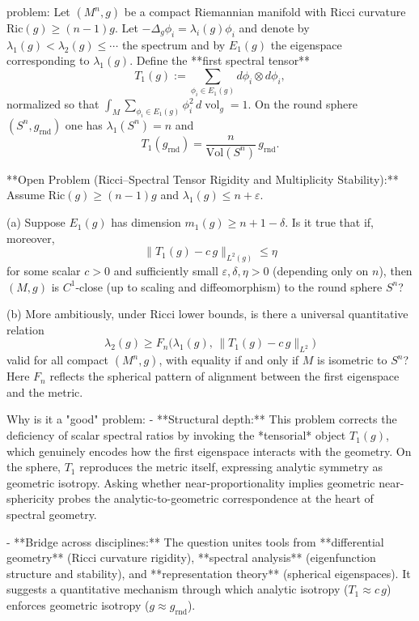 problem:  
Let \((M^n,g)\) be a compact Riemannian manifold with Ricci curvature \(\mathrm{Ric}(g)\ge (n-1)g\).  
Let \(-\Delta_g\phi_i = \lambda_i(g)\phi_i\) and denote by \(\lambda_1(g)<\lambda_2(g)\le\cdots\) the spectrum and by \(E_1(g)\) the eigenspace corresponding to \(\lambda_1(g)\).  Define the **first spectral tensor**  
\[
T_1(g) := \sum_{\phi_i \in E_1(g)} d\phi_i \otimes d\phi_i,
\]
normalized so that \(\int_M \sum_{\phi_i\in E_1(g)} \phi_i^2\,d\operatorname{vol}_g = 1.\)  
On the round sphere \((S^n,g_{\mathrm{rnd}})\) one has \(\lambda_1(S^n)=n\) and 
\[
T_1(g_{\mathrm{rnd}})=\frac{n}{\mathrm{Vol}(S^n)}\,g_{\mathrm{rnd}}.
\]

**Open Problem (Ricci–Spectral Tensor Rigidity and Multiplicity Stability):**  
Assume \(\mathrm{Ric}(g)\ge (n-1)g\) and \(\lambda_1(g) \le n+\varepsilon\).  

(a) Suppose \(E_1(g)\) has dimension \(m_1(g)\ge n+1\!\!-\!\delta\).  
Is it true that if, moreover,
\[
\big\| T_1(g) - c\, g \big\|_{L^2(g)} \le \eta
\]
for some scalar \(c>0\) and sufficiently small \(\varepsilon,\delta,\eta>0\) (depending only on \(n\)), then \((M,g)\) is \(C^1\)-close (up to scaling and diffeomorphism) to the round sphere \(S^n\)?  

(b) More ambitiously, under Ricci lower bounds, is there a universal quantitative relation
\[
\lambda_2(g) \ge F_n\big(\lambda_1(g),\,\|T_1(g)-c\,g\|_{L^2}\big)
\]
valid for all compact \((M^n,g)\), with equality if and only if \(M\) is isometric to \(S^n\)?  
Here \(F_n\) reflects the spherical pattern of alignment between the first eigenspace and the metric.

Why is it a "good" problem:  
- **Structural depth:** This problem corrects the deficiency of scalar spectral ratios by invoking the *tensorial* object \(T_1(g)\), which genuinely encodes how the first eigenspace interacts with the geometry.  On the sphere, \(T_1\) reproduces the metric itself, expressing analytic symmetry as geometric isotropy.  Asking whether near-proportionality implies geometric near-sphericity probes the analytic-to-geometric correspondence at the heart of spectral geometry.  

- **Bridge across disciplines:** The question unites tools from **differential geometry** (Ricci curvature rigidity), **spectral analysis** (eigenfunction structure and stability), and **representation theory** (spherical eigenspaces).  It suggests a quantitative mechanism through which analytic isotropy (\(T_1\approx c\,g\)) enforces geometric isotropy (\(g\approx g_{\mathrm{rnd}}\)).  

